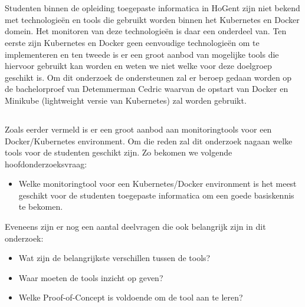\chapter{}
\label{ch:inleiding}


\section{}
\label{sec:probleemstelling}

Studenten binnen de opleiding toegepaste informatica in HoGent zijn niet bekend met technologieën en tools die gebruikt worden binnen het Kubernetes en Docker domein. Het monitoren van deze technologieën is daar een onderdeel van. Ten eerste zijn Kubernetes en Docker geen eenvoudige technologieën om te implementeren en ten tweede is er een groot aanbod van mogelijke tools die hiervoor gebruikt kan worden en weten we niet welke voor deze doelgroep geschikt is. Om dit onderzoek de ondersteunen zal er beroep gedaan worden op de bachelorproef van Detemmerman Cedric waarvan de opstart van Docker en Minikube (lightweight versie van Kubernetes) zal worden gebruikt. 


\section{}
\label{sec:onderzoeksvraag}

Zoals eerder vermeld is er een groot aanbod aan monitoringtools voor een Docker/Kubernetes environment. Om die reden zal dit onderzoek nagaan welke tools voor de studenten geschikt zijn. Zo bekomen we volgende hoofdonderzoeksvraag:

\begin{itemize}
    \item Welke monitoringtool voor een Kubernetes/Docker environment is het meest geschikt voor de studenten toegepaste informatica om een goede basiskennis te bekomen.
\end{itemize}

Eveneens zijn er nog een aantal deelvragen die ook belangrijk zijn in dit onderzoek:

\begin{itemize}
    \item Wat zijn de belangrijkste verschillen tussen de tools?
    \item Waar moeten de tools inzicht op geven?
    \item Welke Proof-of-Concept is voldoende om de tool aan te leren?
\end{itemize}

